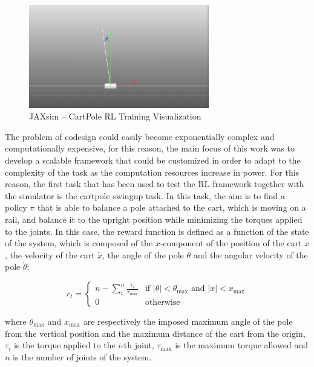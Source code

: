 \begin{figure}
    \centering
    \caption{JAXsim -- CartPole RL Training Visualization}
    \label{fig:cartpole}
    \includegraphics[width=0.7\textwidth]{Images/cartpole.png}
\end{figure}

The problem of codesign could easily become exponentially complex and computationally expensive, for this reason, the main focus of this work was to develop a scalable framework that could be customized in order to adapt to the complexity of the task as the computation resources increase in power. For this reason, the first task that has been used to test the \ac{RL} framework together with the \jaxsim simulator is the cartpole swingup task. In this task, the aim is to find a policy $\pi$ that is able to balance a pole attached to the cart, which is moving on a rail, and balance it to the upright position while minimizing the torques applied to the joints. In this case, the reward function is defined as a function of the state of the system, which is composed of the $x$-component of the position of the cart $x$, the velocity of the cart $\dot{x}$, the angle of the pole $\theta$ and the angular velocity of the pole $\dot{\theta}$:

\begin{equation}
    r _t = \begin{cases}
        n - \sum _i ^n \frac{\tau _i}{\tau _{\text{max}}} & \text{if } \left| \theta \right| < \theta_{\text{max}} \text{ and } \left| x \right| < x_{\text{max}} \\
        0                                                 & \text{otherwise}
    \end{cases}
\end{equation}

where $\theta_{\text{max}}$ and $x _{\text{max}}$ are respectively the imposed maximum angle of the pole from the vertical position and the maximum distance of the cart from the origin, $\tau _i$ is the torque applied to the $i$-th joint, $\tau _{\text{max}}$ is the maximum torque allowed and $n$ is the number of joints of the system.

